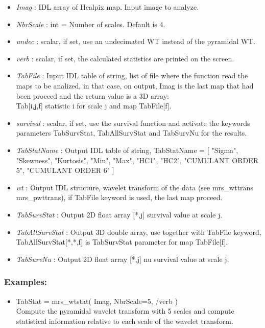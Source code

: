 \begin{itemize}
\item {\em Imag} : IDL array of Healpix map. Input image to analyze. 
\item {\em NbrScale} : int = Number of scales. Default is 4.  
\item {\em undec} : scalar, if set, use an undecimated WT instead of the pyramidal WT.
\item {\em verb} : scalar, if set, the calculated statistics are printed on the screen.
\item {\em TabFile} : Input IDL table of string, list of file where the function read the maps to be analized, in that case, on output, 
Imag is the last map that had been proceed and the return value is a 3D array:\\
Tab[i,j,f] \qquad statistic i for scale j and map TabFile[f].
\item {\em survival} : scalar, if set, use the survival function and activate the keywords parameters 
TabSurvStat, TabAllSurvStat and TabSurvNu for the results.
\item {\em TabStatName} : Output IDL table of string, TabStatName = [ "Sigma", "Skewness", "Kurtosis", "Min", "Max", "HC1", "HC2", "CUMULANT ORDER 5", "CUMULANT ORDER 6" ]
\item {\em wt} : Output IDL structure, wavelet transform of the data (see mrs\_wttrans mrs\_pwttrans), if TabFile keyword is used, the last map proceed.
\item {\em TabSurvStat} : Output 2D float array [*,j] survival value at scale j.
\item {\em TabAllSurvStat} : Output 3D double array, use together with TabFile keyword, TabAllSurvStat[*,*,f] is TabSurvStat parameter for map TabFile[f].
\item {\em TabSurvNu} : Output 2D float array [*,j] nu survival value at scale j.
\end{itemize}

\subsubsection*{Examples:} 
\begin{itemize}
\item TabStat = mrs\_wtstat( Imag, NbrScale=5, /verb ) \\
Compute the pyramidal wavelet transform with 5 scales and compute statistical information relative to each scale of the wavelet transform.
\end{itemize}



